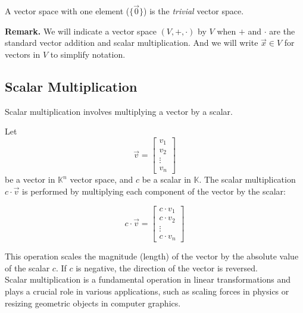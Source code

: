 \begin{tcolorbox}[colback=def_color,colframe=gray] \begin{definition}
    A vector space with one element {\normalfont ($\{\vec 0\}$)} is the \emph{trivial} vector space.
\end{definition}
\end{tcolorbox}

\textbf{Remark.} We will indicate a vector space $(V, +, \cdot)$ by $V$
when $+$ and $\cdot$ are the standard vector addition and scalar multiplication.
And we will write $\vec x \in V$ for vectors in $V$ to simplify notation.

\subsection{Scalar Multiplication}

Scalar multiplication involves multiplying a vector by a scalar. 

\begin{tcolorbox}[colback=def_color,colframe=gray] \begin{definition}
    Let 
$$
\vec{v} = \begin{bmatrix} v_1 \\ v_2 \\ \vdots \\ v_n \end{bmatrix}
$$ 
be a vector in $\mathbb K^n$ vector space, and \(c\) be a scalar in $\mathbb K$. The scalar multiplication \(c \cdot \vec{v}\) is performed by multiplying each component of the vector by the scalar:

\[
c \cdot \vec{v} = \begin{bmatrix} c \cdot v_1 \\ c \cdot v_2 \\ \vdots \\ c \cdot v_n \end{bmatrix}
\]
\end{definition}
\end{tcolorbox}

This operation scales the magnitude (length) of the vector by the absolute value of the scalar \(c\). If \(c\) is negative, the direction of the vector is reversed.
\\

Scalar multiplication is a fundamental operation in linear transformations and plays a crucial role in various applications, such as scaling forces in physics or resizing geometric objects in computer graphics.

